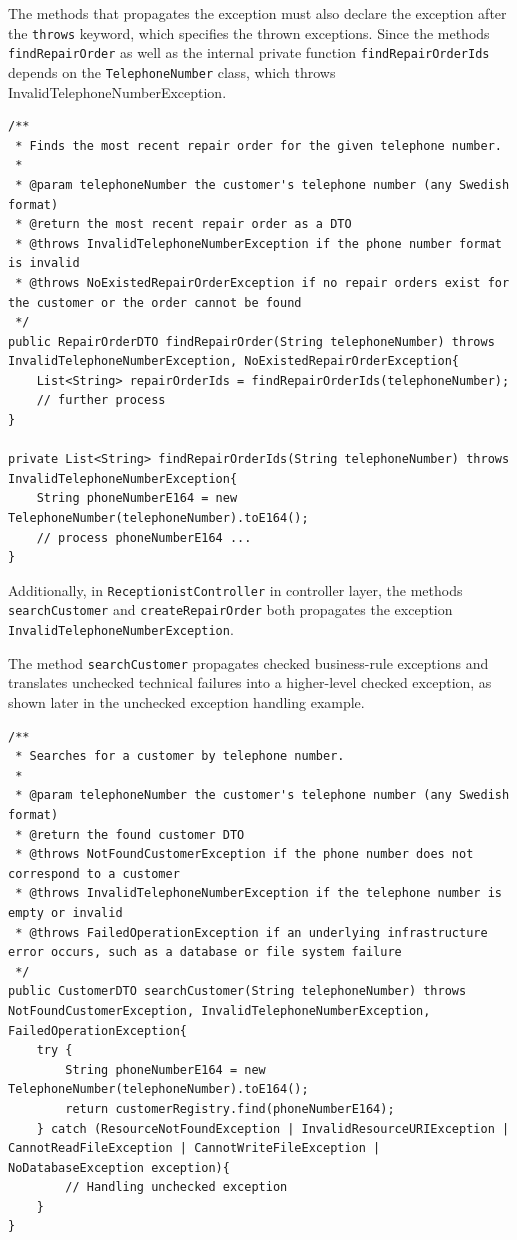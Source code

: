 \documentclass[a4paper]{scrartcl}
\begin{document}
The methods that propagates the exception must also declare the exception after the \texttt{throws} keyword, which specifies the thrown exceptions. Since the methods \texttt{findRepairOrder} as well as the internal private function \texttt{findRepairOrderIds} depends on the \texttt{TelephoneNumber} class, which throws InvalidTelephoneNumberException.

\begin{lstlisting}[style=javastyle, caption={Controller.findRepairOrderIds propagating InvalidTelephoneNumberException}]
/**
 * Finds the most recent repair order for the given telephone number.
 *
 * @param telephoneNumber the customer's telephone number (any Swedish format)
 * @return the most recent repair order as a DTO
 * @throws InvalidTelephoneNumberException if the phone number format is invalid
 * @throws NoExistedRepairOrderException if no repair orders exist for the customer or the order cannot be found
 */
public RepairOrderDTO findRepairOrder(String telephoneNumber) throws InvalidTelephoneNumberException, NoExistedRepairOrderException{
    List<String> repairOrderIds = findRepairOrderIds(telephoneNumber);
    // further process
}

private List<String> findRepairOrderIds(String telephoneNumber) throws InvalidTelephoneNumberException{
    String phoneNumberE164 = new TelephoneNumber(telephoneNumber).toE164();
    // process phoneNumberE164 ...
}
\end{lstlisting}

Additionally, in \texttt{ReceptionistController} in controller layer, the methods \texttt{searchCustomer} and \texttt{createRepairOrder} both propagates the exception \texttt{InvalidTelephoneNumberException}.

The method \texttt{searchCustomer} propagates checked business-rule exceptions and translates unchecked technical failures into a higher-level checked exception, as shown later in the unchecked exception handling example.

\begin{lstlisting}[style=javastyle, caption={searchCustomer and createRepairOrder methods in createRepairOrder class propagating exceptions}]
/**
 * Searches for a customer by telephone number.
 *
 * @param telephoneNumber the customer's telephone number (any Swedish format)
 * @return the found customer DTO
 * @throws NotFoundCustomerException if the phone number does not correspond to a customer
 * @throws InvalidTelephoneNumberException if the telephone number is empty or invalid
 * @throws FailedOperationException if an underlying infrastructure error occurs, such as a database or file system failure
 */
public CustomerDTO searchCustomer(String telephoneNumber) throws NotFoundCustomerException, InvalidTelephoneNumberException, FailedOperationException{
    try {
        String phoneNumberE164 = new TelephoneNumber(telephoneNumber).toE164();
        return customerRegistry.find(phoneNumberE164);
    } catch (ResourceNotFoundException | InvalidResourceURIException | CannotReadFileException | CannotWriteFileException | NoDatabaseException exception){
        // Handling unchecked exception
    }
}
\end{lstlisting}
\end{document}
